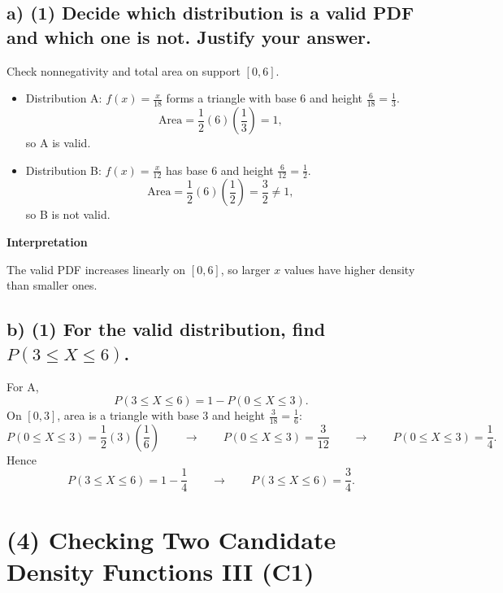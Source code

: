 \subsection*{a) \textbf{(1)} Decide which distribution is a valid PDF and which one is not. Justify your answer.}
\label{subsec:checking-two-candidate-density-functions-ii-c1-a}

Check nonnegativity and total area on support $[0,6]$.
\begin{itemize}
	\item Distribution A: $f(x)=\frac{x}{18}$ forms a triangle with base $6$ and height $\frac{6}{18}=\frac13$.
	\[
	\text{Area}=\frac12(6)\left(\frac13\right)=1,
	\]
	so A is valid.
	\item Distribution B: $f(x)=\frac{x}{12}$ has base $6$ and height $\frac{6}{12}=\frac12$.
	\[
	\text{Area}=\frac12(6)\left(\frac12\right)=\frac32\ne1,
	\]
	so B is not valid.
\end{itemize}

\textbf{Interpretation}


The valid PDF increases linearly on $[0,6]$, so larger $x$ values have higher density than smaller ones.


\subsection*{b) \textbf{(1)} For the valid distribution, find $P(3\le X\le 6)$.}
\label{subsec:checking-two-candidate-density-functions-ii-c1-b}
For A,
\[
P(3\le X\le6)=1-P(0\le X\le3).
\]
On $[0,3]$, area is a triangle with base $3$ and height $\frac{3}{18}=\frac16$:
\[
P(0\le X\le3)=\frac12(3)\left(\frac16\right)\qquad \longrightarrow \qquad P(0\le X\le3)=\frac{3}{12}\qquad \longrightarrow \qquad P(0\le X\le3)=\frac14.
\]
Hence
\[
P(3\le X\le6)=1-\frac14\qquad \longrightarrow \qquad P(3\le X\le6)=\frac34.
\]



\section{(4) Checking Two Candidate Density Functions III (C1)}
\label{sec:checking-two-candidate-density-functions-iii-c1}

